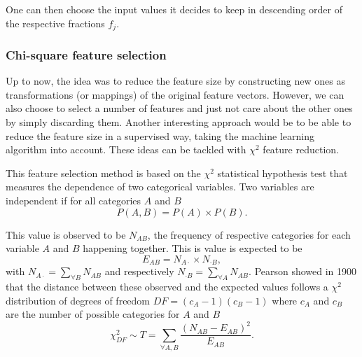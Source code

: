 One can then choose the input values it decides to keep in descending order of the respective fractions $f_j$.

\subsubsection{Chi-square feature selection}
Up to now, the idea was to reduce the feature size by constructing new ones as transformations (or mappings) of the original feature vectors. However, we can also choose to select a number of features and just not care about the other ones by simply discarding them. Another interesting approach would be to be able to reduce the feature size in a supervised way, taking the machine learning algorithm into account. These ideas can be tackled with $\chi^2$ feature reduction.

This feature selection method is based on the $\chi^2$ statistical hypothesis test that measures the dependence of two categorical variables. Two variables are independent if for all categories $A$ and $B$
\begin{equation}
    P(A, B) = P(A) \times P(B).
\end{equation}

This value is observed to be $N_{AB}$, the frequency of respective categories for each variable $A$ and $B$ happening together. This is value is expected to be
\begin{equation}
    E_{AB} = N_{A\cdot} \times N_{\cdot B},
\end{equation}
with $N_{A\cdot} = \sum_{\forall B} N_{AB}$ and respectively $N_{\cdot B} = \sum_{\forall A} N_{AB}$. Pearson showed in 1900 that the distance between these observed and the expected values follows a $\chi^2$ distribution of degrees of freedom $DF = (c_A-1)(c_B-1)$ where $c_A$ and $c_B$ are the number of possible categories for $A$ and $B$
\begin{equation}
    \chi^2_{DF} \sim T = \sum_{\forall A,B} \frac{\left(N_{AB}-E_{AB}\right)^2}{E_{AB}}.
\end{equation}

